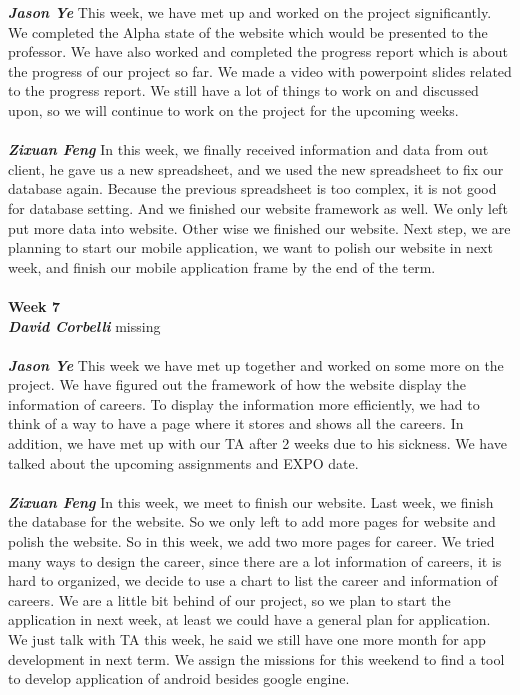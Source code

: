 \documentclass[onecolumn, draftclsnofoot,10pt, compsoc]{IEEEtran}
\begin{document}
\noindent\textbf{\textit{Jason Ye}}
This week, we have met up and worked on the project significantly. We completed the Alpha state of the website which would be presented to the professor. We have also worked and completed the progress report which is about the progress of our project so far. We made a video with powerpoint slides related to the progress report. We still have a lot of things to work on and discussed upon, so we will continue to work on the project for the upcoming weeks.\\ \\
\textbf{\textit{Zixuan Feng}}
In this week, we finally received information and data from out client, he gave us a new spreadsheet, and we used the new spreadsheet to fix our database again. Because the previous spreadsheet is too complex, it is not good for database setting. And we finished our website framework as well. We only left put more data into website. Other wise we finished our website. Next step, we are planning to start our mobile application, we want to polish our website in next week, and finish our mobile application frame by the end of the term.\\ \\
\textbf{Week 7}
\\ \textbf{\textit{David Corbelli}}
missing\\ \\
\textbf{\textit{Jason Ye}}
This week we have met up together and worked on some more on the project. We have figured out the framework of how the website display the information of careers. To display the information more efficiently, we had to think of a way to have a page where it stores and shows all the careers. In addition, we have met up with our TA after 2 weeks due to his sickness. We have talked about the upcoming assignments and EXPO date.\\ \\
\textbf{\textit{Zixuan Feng}}
In this week, we meet to finish our website. Last week, we finish the database for the website. So we only left to add more pages for website and polish the website. So in this week, we add two more pages for career. We tried many ways to design the career, since there are a lot information of careers, it is hard to organized, we decide to use a chart to list the career and information of careers. We are a little bit behind of our project, so we plan to start the application in next week, at least we could have a general plan for application. We just talk with TA this week, he said we still have one more month for app development in next term. We assign the missions for this weekend to find a tool to develop application of android besides google engine.\\ \\
\end{document}
